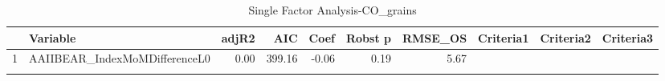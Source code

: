 \begin{longtable}{rlrrrrrlll}
  \hline
 & Variable & adjR2 & AIC & Coef & Robst p & RMSE\_OS & Criteria1 & Criteria2 & Criteria3 \\ 
  \hline
1 & AAIIBEAR\_IndexMoMDifferenceL0 & 0.00 & 399.16 & -0.06 & 0.19 & 5.67 &  &  &  \\ 
   \hline
\hline
\caption{Single Factor Analysis-CO_grains} 
\end{longtable}
